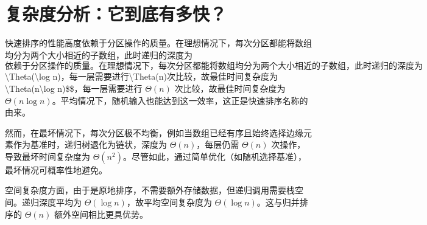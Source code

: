 \chapter{复杂度分析：它到底有多快？}
快速排序的性能高度依赖于分区操作的质量。在理想情况下，每次分区都能将数组均分为两个大小相近的子数组，此时递归的深度为 $依赖于分区操作的质量。在理想情况下，每次分区都能将数组均分为两个大小相近的子数组，此时递归的深度为 $\textbackslash{}Theta(\textbackslash{}log n)$，每一层需要进行 $\textbackslash{}Theta(n)$ 次比较，故最佳时间复杂度为 $\textbackslash{}Theta(n\textbackslash{}log n)\${}\${}，每一层需要进行 $\Theta(n)$ 次比较，故最佳时间复杂度为 $\Theta(n\log n)$。平均情况下，随机输入也能达到这一效率，这正是快速排序名称的由来。\par
然而，在最坏情况下，每次分区极不均衡，例如当数组已经有序且始终选择边缘元素作为基准时，递归树退化为链状，深度为 $\Theta(n)$，每层仍需 $\Theta(n)$ 次操作，导致最坏时间复杂度为 $\Theta(n^2)$。尽管如此，通过简单优化（如随机选择基准），最坏情况可概率性地避免。\par
空间复杂度方面，由于是原地排序，不需要额外存储数据，但递归调用需要栈空间。递归深度平均为 $\Theta(\log{n})$，故平均空间复杂度为 $\Theta(\log{n})$。这与归并排序的 $\Theta(n)$ 额外空间相比更具优势。\par

